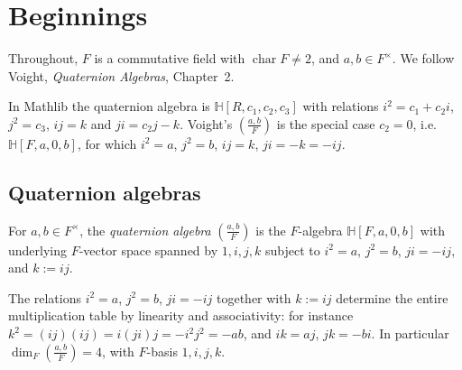 


\section{Beginnings}

Throughout, $F$ is a commutative field with $\operatorname{char} F \neq 2$, and
$a, b \in F^\times$. We follow Voight, \emph{Quaternion Algebras}, Chapter~2.

In Mathlib the quaternion algebra is $\mathbb{H}[R, c_1, c_2, c_3]$ with relations
$i^2 = c_1 + c_2 i$, $j^2 = c_3$, $ij = k$ and $ji = c_2 j - k$. Voight's
$\left(\frac{a,b}{F}\right)$ is the special case $c_2 = 0$, i.e.
$\mathbb{H}[F, a, 0, b]$, for which $i^2 = a$, $j^2 = b$, $ij = k$, $ji = -k = -ij$.

\subsection{Quaternion algebras}

\begin{definition}
    \label{def:quaternion-algebra}
    \leanok
    For $a, b \in F^\times$, the \emph{quaternion algebra}
    $\left(\frac{a,b}{F}\right)$ is the $F$-algebra $\mathbb{H}[F, a, 0, b]$ with
    underlying $F$-vector space spanned by $1, i, j, k$ subject to
    $i^2 = a$, $j^2 = b$, $ji = -ij$, and $k := ij$.
\end{definition}

The relations $i^2 = a$, $j^2 = b$, $ji = -ij$ together with $k := ij$ determine
the entire multiplication table by linearity and associativity: for instance
$k^2 = (ij)(ij) = i(ji)j = -i^2 j^2 = -ab$, and $ik = aj$, $jk = -bi$. In
particular $\dim_F \left(\frac{a,b}{F}\right) = 4$, with $F$-basis $1, i, j, k$.

